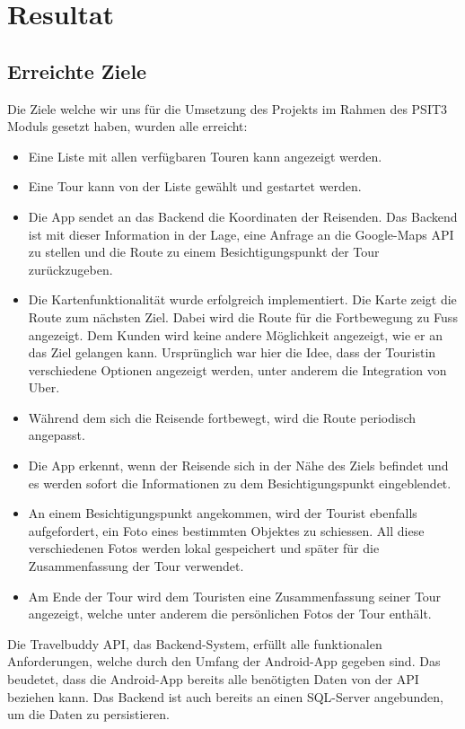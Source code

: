 \section{Resultat}\label{resultat}

\subsection{Erreichte Ziele}\label{erreichteZiele}

Die Ziele welche wir uns für die Umsetzung des Projekts im Rahmen des PSIT3 Moduls gesetzt haben, wurden alle erreicht:
\begin{itemize}
  \item Eine Liste mit allen verfügbaren Touren kann angezeigt werden.
  \item Eine Tour kann von der Liste gewählt und gestartet werden.
  \item Die App sendet an das Backend die Koordinaten der Reisenden. Das Backend ist mit dieser Information in der Lage, eine Anfrage an die Google-Maps API zu stellen und die Route zu einem Besichtigungspunkt der Tour zurückzugeben.
  \item Die Kartenfunktionalität wurde erfolgreich implementiert. Die Karte zeigt die Route zum nächsten Ziel. Dabei wird die Route für die Fortbewegung zu Fuss angezeigt. Dem Kunden wird keine andere Möglichkeit angezeigt, wie er an das Ziel gelangen kann. Ursprünglich war hier die Idee, dass der Touristin verschiedene Optionen angezeigt werden, unter anderem die Integration von Uber.
  \item Während dem sich die Reisende fortbewegt, wird die Route periodisch angepasst.
  \item Die App erkennt, wenn der Reisende sich in der Nähe des Ziels befindet und es werden sofort die Informationen zu dem Besichtigungspunkt eingeblendet.
  \item An einem Besichtigungspunkt angekommen, wird der Tourist ebenfalls aufgefordert, ein Foto eines bestimmten Objektes zu schiessen. All diese verschiedenen Fotos werden lokal gespeichert und später für die Zusammenfassung der Tour verwendet.
  \item Am Ende der Tour wird dem Touristen eine Zusammenfassung seiner Tour angezeigt, welche unter anderem die persönlichen Fotos der Tour enthält.
\end{itemize}

Die Travelbuddy API, das Backend-System, erfüllt alle funktionalen Anforderungen, welche durch den Umfang der Android-App gegeben sind. Das beudetet, dass die Android-App bereits alle benötigten Daten von der API beziehen kann. Das Backend ist auch bereits an einen SQL-Server angebunden, um die Daten zu persistieren.


